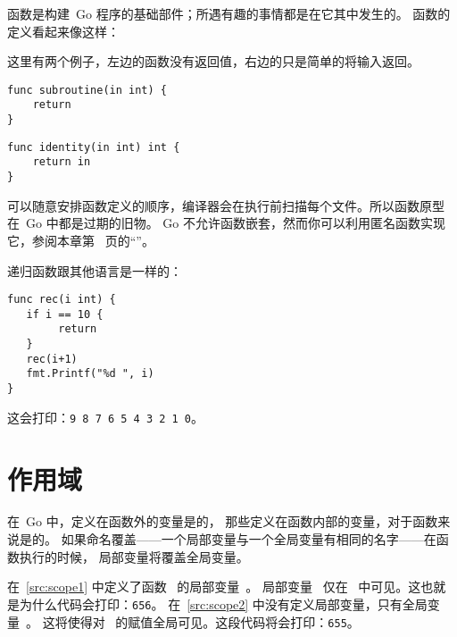 
\noindent{}函数是构建~Go 程序的基础部件；所遇有趣的事情都是在它其中发生的。
函数的定义看起来像这样：

\showremarks
这里有两个例子，左边的函数没有返回值，右边的只是简单的将输入返回。

\begin{minipage}{.5\textwidth}
\begin{lstlisting}
func subroutine(in int) {
    return
}
\end{lstlisting}
\end{minipage}
\begin{minipage}{.5\textwidth}
\begin{lstlisting}
func identity(in int) int {
    return in
}
\end{lstlisting}
\end{minipage}

可以随意安排函数定义的顺序，编译器会在执行前扫描每个文件。所以函数原型在~Go 中都是过期的旧物。
Go 不允许函数嵌套，然而你可以利用匿名函数实现它，参阅本章第~\pageref{sec:functions as values}
页的``''。


递归函数跟其他语言是一样的：
\begin{lstlisting}[caption=递归函数]
func rec(i int) {
   if i == 10 {
        return
   }
   rec(i+1)
   fmt.Printf("%d ", i)
}
\end{lstlisting}
这会打印：\texttt{9 8 7 6 5 4 3 2 1 0}。

\section{作用域}
在~Go 中，定义在函数外的变量是的，
那些定义在函数内部的变量，对于函数来说是的。
如果命名覆盖——一个局部变量与一个全局变量有相同的名字——在函数执行的时候，
局部变量将覆盖全局变量。

\begin{minipage}{.5\textwidth}

\hfill
\vfill
\end{minipage}
\hfill
\begin{minipage}{.5\textwidth}

\hfill
\vfill
\end{minipage}

在~\ref{src:scope1} 中定义了函数~ 的局部变量~。
局部变量~ 仅在~ 中可见。这也就是为什么代码会打印：\texttt{656}。
在~\ref{src:scope2} 中没有定义局部变量，只有全局变量~。
这将使得对~ 的赋值全局可见。这段代码将会打印：\texttt{655}。

